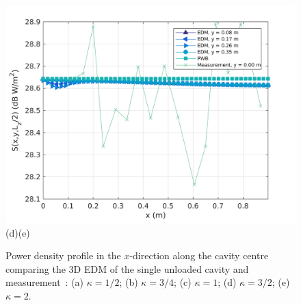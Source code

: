\documentclass[a4paper]{article}
\numberwithin{equation}{section}
\begin{document}
\begin{figure}[ht]
\begin{center}
\includegraphics[width=0.49\linewidth]{figures/SDM_3D_SU_PowerDensityProfileXMeas_JX_k2_0}\\
{\footnotesize (d)\hspace{75mm}(e)}\\
\vspace{-2mm}
\caption{\label{fg:measprofssuk} Power density profile in the $x$-direction along the cavity centre comparing
the 3D EDM of the single unloaded cavity and measurement~\citep{Flintoft2017b}: (a) $\kappa=1/2$; (b) $\kappa=3/4$;
(c) $\kappa=1$; (d) $\kappa=3/2$; (e) $\kappa=2$.}
\end{center}
\end{figure}
\end{document}
